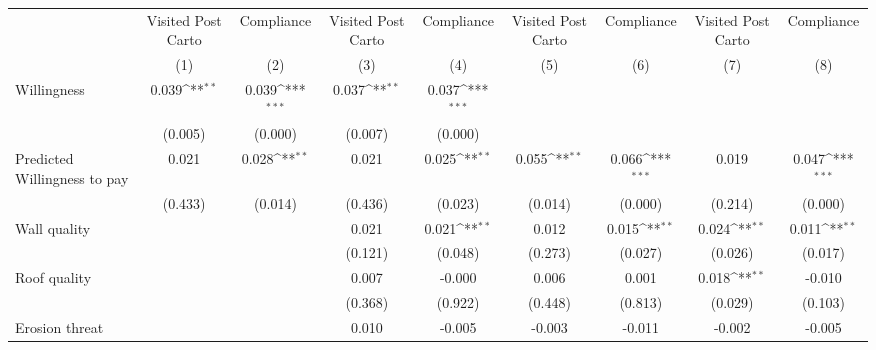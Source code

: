 {
\def\sym#1{\ifmmode^{#1}\else\(^{#1}\)\fi}
\begin{tabular}{l*{8}{c}}
\toprule
                &\multicolumn{1}{c}{Visited Post Carto}&\multicolumn{1}{c}{Compliance}&\multicolumn{1}{c}{Visited Post Carto}&\multicolumn{1}{c}{Compliance}&\multicolumn{1}{c}{Visited Post Carto}&\multicolumn{1}{c}{Compliance}&\multicolumn{1}{c}{Visited Post Carto}&\multicolumn{1}{c}{Compliance}\\
                &\multicolumn{1}{c}{(1)}         &\multicolumn{1}{c}{(2)}         &\multicolumn{1}{c}{(3)}         &\multicolumn{1}{c}{(4)}         &\multicolumn{1}{c}{(5)}         &\multicolumn{1}{c}{(6)}         &\multicolumn{1}{c}{(7)}         &\multicolumn{1}{c}{(8)}         \\
\midrule
Willingness     &    0.039\sym{**} &    0.039\sym{***}&    0.037\sym{**} &    0.037\sym{***}&                  &                  &                  &                  \\
                &  (0.005)         &  (0.000)         &  (0.007)         &  (0.000)         &                  &                  &                  &                  \\
Predicted Willingness to pay&    0.021         &    0.028\sym{**} &    0.021         &    0.025\sym{**} &    0.055\sym{**} &    0.066\sym{***}&    0.019         &    0.047\sym{***}\\
                &  (0.433)         &  (0.014)         &  (0.436)         &  (0.023)         &  (0.014)         &  (0.000)         &  (0.214)         &  (0.000)         \\
Wall quality    &                  &                  &    0.021         &    0.021\sym{**} &    0.012         &    0.015\sym{**} &    0.024\sym{**} &    0.011\sym{**} \\
                &                  &                  &  (0.121)         &  (0.048)         &  (0.273)         &  (0.027)         &  (0.026)         &  (0.017)         \\
Roof quality    &                  &                  &    0.007         &   -0.000         &    0.006         &    0.001         &    0.018\sym{**} &   -0.010         \\
                &                  &                  &  (0.368)         &  (0.922)         &  (0.448)         &  (0.813)         &  (0.029)         &  (0.103)         \\
Erosion threat  &                  &                  &    0.010         &   -0.005         &   -0.003         &   -0.011         &   -0.002         &   -0.005         \\

\end{tabular}}
